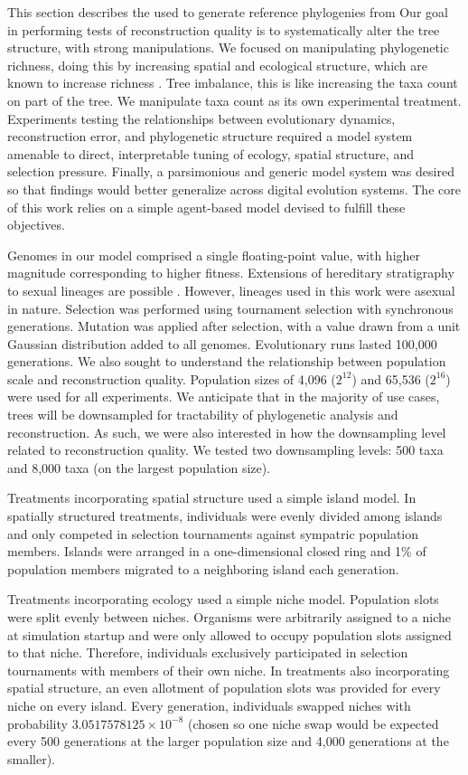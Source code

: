 This section describes the used to generate reference phylogenies from
Our goal in performing tests of reconstruction quality is to systematically alter the tree structure, with strong manipulations.
We focused on manipulating phylogenetic richness, doing this by increasing spatial and ecological structure, which are known to increase richness \citep{moreno2024ecology,gomez2019understanding,valiente2007facilitation}.
Tree imbalance, this is like increasing the taxa count on part of the tree.
We manipulate taxa count as its own experimental treatment.
Experiments testing the relationships between evolutionary dynamics, reconstruction error, and phylogenetic structure required a model system amenable to direct, interpretable tuning of ecology, spatial structure, and selection pressure.
Finally, a parsimonious and generic model system was desired so that findings would better generalize across digital evolution systems.
The core of this work relies on a simple agent-based model devised to fulfill these objectives.

Genomes in our model comprised a single floating-point value, with higher magnitude corresponding to higher fitness.
Extensions of hereditary stratigraphy to sexual lineages are possible \citep{moreno2024methods}.
However, lineages used in this work were asexual in nature.
Selection was performed using tournament selection with synchronous generations.
Mutation was applied after selection, with a value drawn from a unit Gaussian distribution added to all genomes.
Evolutionary runs lasted 100,000 generations.
We also sought to understand the relationship between population scale and reconstruction quality.
Population sizes of 4,096 ($2^{12}$) and 65,536 ($2^{16}$) were used for all experiments.
We anticipate that in the majority of use cases, trees will be downsampled for tractability of phylogenetic analysis and reconstruction.
As such, we were also interested in how the downsampling level related to reconstruction quality.
We tested two downsampling levels: 500 taxa and 8,000 taxa (on the largest population size).

Treatments incorporating spatial structure used a simple island model.
In spatially structured treatments, individuals were evenly divided among islands and only competed in selection tournaments against sympatric population members.
Islands were arranged in a one-dimensional closed ring and 1\% of population members migrated to a neighboring island each generation.

Treatments incorporating ecology used a simple niche model.
Population slots were split evenly between niches.
Organisms were arbitrarily assigned to a niche at simulation startup and were only allowed to occupy population slots assigned to that niche.
Therefore, individuals exclusively participated in selection tournaments with members of their own niche.
In treatments also incorporating spatial structure, an even allotment of population slots was provided for every niche on every island.
Every generation, individuals swapped niches with probability $3.0517578125 \times 10^{-8}$ (chosen so one niche swap would be expected every 500 generations at the larger population size and 4,000 generations at the smaller). 

